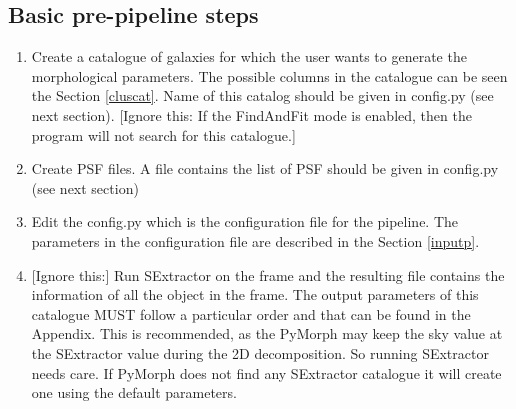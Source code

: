 \documentclass[a4paper,10pt]{article}
\newcommand{\red}[1]{{\color{red}[#1]}}
\begin{document}
\subsection{Basic pre-pipeline steps}
\begin{enumerate}
 \item
Create a catalogue of galaxies for which the user wants to generate the morphological parameters. The possible columns in the catalogue can be seen the Section \ref{cluscat}. Name of this catalog should be given in config.py (see next section). \red{Ignore this: If the FindAndFit mode is enabled, then the program will not search for this catalogue.}
\item
Create PSF files. A file contains the list of PSF should be given in config.py (see next section) %
\item
Edit the config.py which is the configuration file for the pipeline. The parameters in the configuration file are described in the Section \ref{inputp}.
 \item 
\red{Ignore this:} Run SExtractor on the frame and the resulting file contains the information of all the object in the frame. The output parameters of this catalogue MUST follow a particular order and that can be found in the Appendix. This is recommended, as the PyMorph may keep the sky value at the SExtractor value during the 2D decomposition. So running SExtractor needs care. If PyMorph does not find any SExtractor catalogue it will create one using the default parameters.
\end{enumerate}
\end{document}
